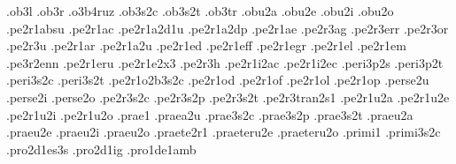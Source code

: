 {.ob3l                             %
.ob3r                             %
.o3b4ruz                          %
.ob3s2c                           %
.ob3s2t                           %
.ob3tr                            %
.obu2a .obu2e .obu2i .obu2o       %
.pe2r1absu                        %
.pe2r1ac                          %
.pe2r1a2d1u                       %
.pe2r1a2dp                        %
.pe2r1ae                          %
.pe2r3ag .pe2r3err .pe2r3or .pe2r3u   %
.pe2r1ar                          %
.pe2r1a2u                         %
.pe2r1ed                          %
.pe2r1eff                         %
.pe2r1egr                         %
.pe2r1el                          %
.pe2r1em                          %
.pe3r2enn                         %
.pe2r1eru                         %
.pe2r1e2x3                        %
.pe2r3h                           %
.pe2r1i2ac                        %
.pe2r1i2ec                        %
.peri3p2s                         %
.peri3p2t                         %
.peri3s2c                         %
.peri3s2t                         %
.pe2r1o2b3s2c                     %
.pe2r1od                          %
.pe2r1of                          %
.pe2r1ol                          %
.pe2r1op                          %
.perse2u .perse2i .perse2o        %
.pe2r3s2c                         %
.pe2r3s2p .pe2r3s2t               %
.pe2r3tran2s1                     %
.pe2r1u2a .pe2r1u2e .pe2r1u2i .pe2r1u2o %
.prae1
.praea2u                          %
.prae3s2c                         %
.prae3s2p                         %
.prae3s2t                         %
.praeu2a .praeu2e .praeu2i .praeu2o %
.praete2r1
.praeteru2e .praeteru2o           %
.primi1
.primi3s2c                        %
.pro2d1es3s .pro2d1ig             %
.pro1de1amb                       %
}
